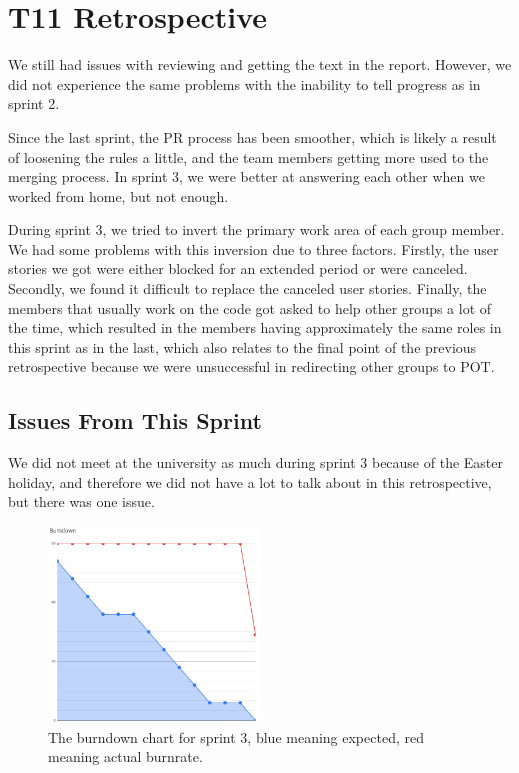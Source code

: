 \section{T11 Retrospective}

We still had issues with reviewing and getting the text in the report. However, we did not experience the same problems with the inability to tell progress as in sprint 2.

Since the last sprint, the \gls{PR} process has been smoother, which is likely a result of loosening the rules a little, and the team members getting more used to the merging process. In sprint 3, we were better at answering each other when we worked from home, but not enough.

During sprint 3, we tried to invert the primary work area of each group member. We had some problems with this inversion due to three factors. Firstly, the user stories we got were either blocked for an extended period or were canceled. Secondly, we found it difficult to replace the canceled user stories. Finally, the members that usually work on the code got asked to help other groups a lot of the time, which resulted in the members having approximately the same roles in this sprint as in the last, which also relates to the final point of the previous retrospective because we were unsuccessful in redirecting other groups to \gls{POT}.

\subsection{Issues From This Sprint}

We did not meet at the university as much during sprint 3 because of the Easter holiday, and therefore we did not have a lot to talk about in this retrospective, but there was one issue.

\begin{figure}[ht]
    \centering
    \includegraphics[width=0.5\textwidth]{figures/burndown.png}
    \caption{The burndown chart for sprint 3, blue meaning expected, red meaning actual burnrate.}
    \label{fig:burndown-chart}
\end{figure}

